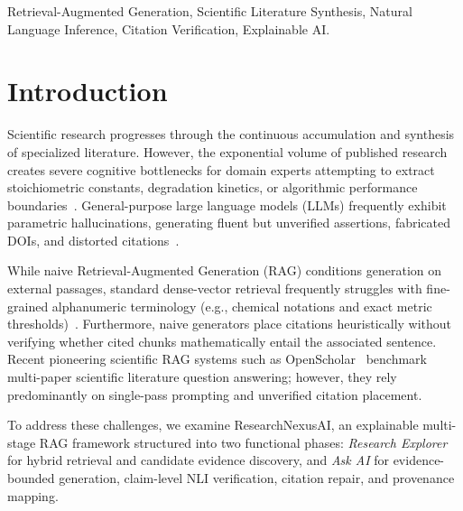 \documentclass[conference]{IEEEtran}
\begin{document}
\begin{IEEEkeywords}
Retrieval-Augmented Generation, Scientific Literature Synthesis, Natural Language Inference, Citation Verification, Explainable AI.
\end{IEEEkeywords}

\section{Introduction}
Scientific research progresses through the continuous accumulation and synthesis of specialized literature. However, the exponential volume of published research creates severe cognitive bottlenecks for domain experts attempting to extract stoichiometric constants, degradation kinetics, or algorithmic performance boundaries~\cite{asai2024openscholar}. General-purpose large language models (LLMs) frequently exhibit parametric hallucinations, generating fluent but unverified assertions, fabricated DOIs, and distorted citations~\cite{lewis2020rag}. 

While naive Retrieval-Augmented Generation (RAG) conditions generation on external passages, standard dense-vector retrieval frequently struggles with fine-grained alphanumeric terminology (e.g., chemical notations and exact metric thresholds)~\cite{robertson2009bm25,cormack2009rrf}. Furthermore, naive generators place citations heuristically without verifying whether cited chunks mathematically entail the associated sentence. Recent pioneering scientific RAG systems such as OpenScholar~\cite{asai2024openscholar} benchmark multi-paper scientific literature question answering; however, they rely predominantly on single-pass prompting and unverified citation placement.

To address these challenges, we examine ResearchNexusAI, an explainable multi-stage RAG framework structured into two functional phases: \textit{Research Explorer} for hybrid retrieval and candidate evidence discovery, and \textit{Ask AI} for evidence-bounded generation, claim-level NLI verification, citation repair, and provenance mapping. 
\end{document}
